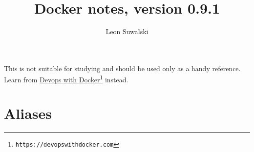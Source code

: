\documentclass{charun}
\title{Docker notes, version 0.9.1}
\author{Leon Suwalski}
\begin{document}
\begin{multicols}{2}
\maketitle
\raggedright

This is not suitable for studying and should be used only as a handy reference.
Learn from \href{https://devopswithdocker.com}{Devops with Docker}\footnote{\texttt{https://devopswithdocker.com}} instead.










\section{Aliases}


\end{multicols}
\end{document}
